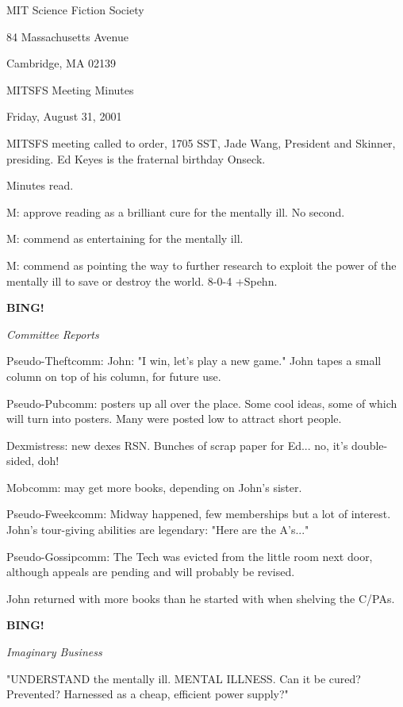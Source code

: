 \documentclass[12pt]{article}
\newcommand{\bing}{{\bf BING!} }
\newcommand{\goto}[1]{\bing \vskip 12pt \centerline{{\em{#1}}}}
\begin{document}
\begin{center}

MIT Science Fiction Society 

84 Massachusetts Avenue

Cambridge, MA 02139

\vspace{12pt}

MITSFS Meeting Minutes 

Friday, August 31, 2001

\end{center}
 
\vspace{18pt}

\setlength{\parskip}{6pt}

\noindent
MITSFS meeting called to order, 1705 SST, Jade Wang, President and
Skinner, presiding.  Ed Keyes is the fraternal birthday Onseck.

Minutes read.

M: approve reading as a brilliant cure for the mentally ill. No second.

M: commend as entertaining for the mentally ill.

M: commend as pointing the way to further research to exploit the power of the mentally ill to save or destroy the world. 8-0-4 +Spehn.

\goto{Committee Reports}

Pseudo-Theftcomm: John: "I win, let's play a new game." John tapes a small column on top of his column, for future use.

Pseudo-Pubcomm: posters up all over the place. Some cool ideas, some of which will turn into posters. Many were posted low to attract short people.

Dexmistress: new dexes RSN. Bunches of scrap paper for Ed... no, it's double-sided, doh!

Mobcomm: may get more books, depending on John's sister.

Pseudo-Fweekcomm: Midway happened, few memberships but a lot of interest. John's tour-giving abilities are legendary: "Here are the A's..."

Pseudo-Gossipcomm: The Tech was evicted from the little room next door, although appeals are pending and will probably be revised.

John returned with more books than he started with when shelving the C/PAs.

\goto{Imaginary Business}

"UNDERSTAND the mentally ill. MENTAL ILLNESS. Can it be cured? Prevented? Harnessed as a cheap, efficient power supply?"
\end{document}
